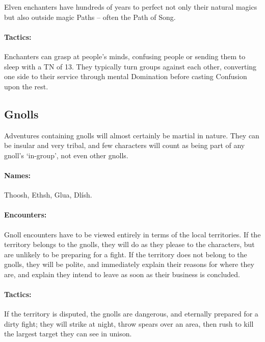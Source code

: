 \begin{multicols}{2}

\label{elven_enchanter}

Elven enchanters have hundreds of years to perfect not only their natural magics but also outside magic Paths -- often the Path of Song.


\paragraph{Tactics:} Enchanters can grasp at people's minds, confusing people or sending them to sleep with a TN of 13.
They typically turn groups against each other, converting one side to their service through mental Domination before casting Confusion upon the rest.

\subsection{Gnolls}

\label{gnoll_hunter}

Adventures containing gnolls will almost certainly be martial in nature.  They can be insular and very tribal, and few characters will count as being part of any gnoll's `in-group', not even other gnolls.

\paragraph{Names:} Thoosh, Ethsh, Glua, Dl\'{i}sh.



\paragraph{Encounters:} Gnoll encounters have to be viewed entirely in terms of the local territories.
If the territory belongs to the gnolls, they will do as they please to the characters, but are unlikely to be preparing for a fight.
If the territory does not belong to the gnolls, they will be polite, and immediately explain their reasons for where they are, and explain they intend to leave as soon as their business is concluded.
\paragraph{Tactics:}
If the territory is disputed, the gnolls are dangerous, and eternally prepared for a dirty fight; they will strike at night, throw spears over an area, then rush to kill the largest target they can see in unison.


\end{multicols}
